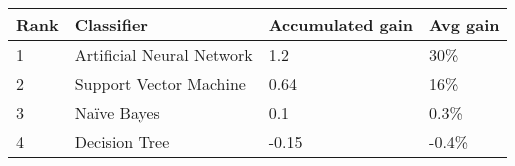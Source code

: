 \begin{tabular}{|l|l|l|l|}
\hline
Rank  & Classifier                & Accumulated gain  & Avg gain\\
\hline
1        & Artificial Neural Network & 1.2  & 30\%        \\
2        & Support Vector Machine    & 0.64  & 16\%       \\
3        & Naïve Bayes               & 0.1   & 0.3\%         \\
4        & Decision Tree             & -0.15  & -0.4\%         \\




\hline
\end{tabular}
